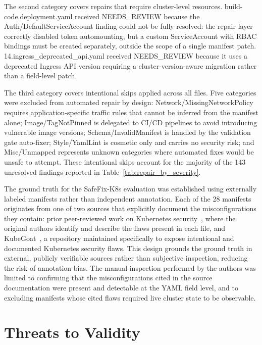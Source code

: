 \documentclass[preprint,12pt]{elsarticle}
\newcommand{\new}[1]{#1}
\begin{document}
\new{
The second category covers repairs that require cluster-level 
resources. build-code.deployment.yaml received NEEDS\_REVIEW because 
the Auth/DefaultServiceAccount finding could not be fully resolved: 
the repair layer correctly disabled token automounting, but a custom 
ServiceAccount with RBAC bindings must be created separately, outside 
the scope of a single manifest patch. 14.ingress\_deprecated\_api.yaml 
received NEEDS\_REVIEW because it uses a deprecated Ingress API version 
requiring a cluster-version-aware migration rather than a field-level 
patch.}
\new{
The third category covers intentional skips applied across all files. 
Five categories were excluded from automated repair by design: 
Network/MissingNetworkPolicy requires application-specific traffic 
rules that cannot be inferred from the manifest alone; 
Image/TagNotPinned is delegated to CI/CD pipelines to avoid 
introducing vulnerable image versions; Schema/InvalidManifest is 
handled by the validation gate auto-fixer; Style/YamlLint is 
cosmetic only and carries no security risk; and Misc/Unmapped 
represents unknown categories where automated fixes would be unsafe 
to attempt. These intentional skips account for the majority of 
the 143 unresolved findings reported in 
Table~\ref{tab:repair_by_severity}. }

The ground truth for the SafeFix-K8s evaluation was established using
externally labeled manifests rather than independent annotation. Each
of the 28 manifests originates from one of two sources that explicitly
document the misconfigurations they contain: prior peer-reviewed work
on Kubernetes security~\cite{malul2024genkubesec,ye2025llmsecconfig,shamim2024technoeducational,dellimmagine2023kubehound},
where the original authors identify and describe the flaws present in
each file, and KubeGoat~\cite{madhuakula_kubernetes_goat}, a
repository maintained specifically to expose intentional and
documented Kubernetes security flaws. This design grounds the ground
truth in external, publicly verifiable sources rather than subjective
inspection, reducing the risk of annotation bias. The manual
inspection performed by the authors was limited to confirming that
the misconfigurations cited in the source documentation were present
and detectable at the YAML field level, and to excluding manifests
whose cited flaws required live cluster state to be observable.






\new{\section{Threats to Validity}}
\label{sec:threats}
\end{document}
